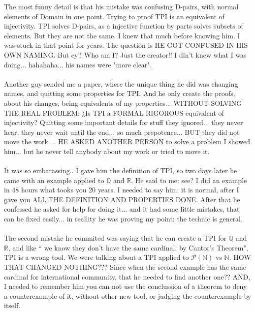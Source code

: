 		\noindent
		The most funny detail is that his mistake was confusing D-pairs, with normal elements of Domain in one point. Trying to proof TPI is an equivalent of injectivity. TPI solves D-pairs, as a injective function by parts solves subsets of elements. But they are not the same. I knew that much before knowing him. I was stuck in that point for years. The question is HE GOT CONFUSED IN HIS OWN NAMING. But ey!! Who am I? Just the creator!! I din't knew what I was doing... hahahaha... his names were "more clear".
		\\\\
		
		\noindent
		Another guy sended me a paper, where the unique thing he did was changing names, and quitting some properties for TPI. And he only create the proofs, about his changes, being equivalents of my properties... WITHOUT SOLVING THE REAL PROBLEM: ¿Is TPI a FORMAL RIGOROUS equivalent of injectivity? Quitting some important details for stuff they ignored... they never hear, they never wait until the end... so much prepotence... BUT they did not move the work.... HE ASKED ANOTHER PERSON to solve a problem I showed him... but he never tell anybody about my work or tried to move it.
		\\\\
		
		\noindent
		It was so embarassing.. I gave him the definition of TPI, so two days later he came with an example applied to $\mathbb{Q}$ and $\mathbb{R}$. He said to me: see? I did an example in 48 hours what tooks you 20 years. I needed to say him: it is normal, after I gave you ALL THE DEFINITION AND PROPERTIES DONE. After that he confessed he asked for help for doing it... and it had some little mistakes, that can be fixed easily... in reallity he was proving my point: the technic is general.
		\\\\
		
		\noindent
		The second mistake he commited was saying that he can create a TPI for $\mathbb{Q}$ and $\mathbb{R}$, and like `` we know they don't have the same cardinal, by Cantor's Theorem'', TPI is a wrong tool. We were talking about a TPI applied to $\mathcal{P}(\mathbb{N})$ vs $\mathbb{N}$. HOW THAT CHANGED NOTHING??? Since when the second example has the same cardinal for international community, that he needed to find another one?? AND, I needed to remember him you can not use the conclussion of a theorem to deny a counterexample of it, without other new tool, or judging the counterexample by itself.
		\\\\
		
